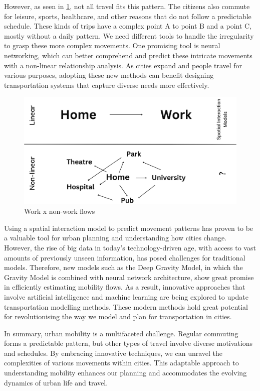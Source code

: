     However, as seen in \ref{fig: context}, not all travel fits this pattern. The citizens also commute for leisure, sports, healthcare, and other reasons that do not follow a predictable schedule. These kinds of trips have a complex point A to point B and a point C, mostly without a daily pattern. We need different tools to handle the irregularity to grasp these more complex movements. One promising tool is neural networking, which can better comprehend and predict these intricate movements with a non-linear relationship analysis\citep{camburuExplainingDeepNeural2021}. As cities expand and people travel for various purposes, adopting these new methods can benefit designing transportation systems that capture diverse needs more effectively.
   
    \begin{figure}[H]
        \centering
        \includegraphics[width=12cm]{Images/context.png}
        \caption{Work x non-work flows}
        \label{fig: context}
    \end{figure}

   Using a spatial interaction model to predict movement patterns has proven to be a valuable tool for urban planning and understanding how cities change\citep{wilsonFamilySpatialInteraction1971b}. However, the rise of big data in today's technology-driven age, with access to vast amounts of previously unseen information, has posed challenges for traditional models. Therefore, new models such as the Deep Gravity Model, in which the Gravity Model is combined with neural network architecture, show great promise in efficiently estimating mobility flows. As a result, innovative approaches that involve artificial intelligence and machine learning are being explored to update transportation modelling methods. These modern methods hold great potential for revolutionising the way we model and plan for transportation in cities.

    In summary, urban mobility is a multifaceted challenge. Regular commuting forms a predictable pattern, but other types of travel involve diverse motivations and schedules. By embracing innovative techniques, we can unravel the complexities of various movements within cities. This adaptable approach to understanding mobility enhances our planning and accommodates the evolving dynamics of urban life and travel.
    
